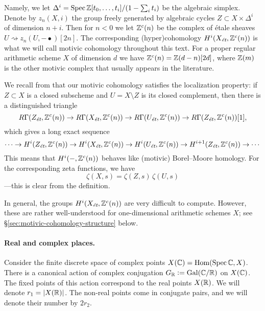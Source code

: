 \documentclass{article}
\numberwithin{equation}{section}
\begin{document}
Namely, we let $\Delta^i = \Spec \ZZ [t_0,\ldots,t_i] / (1 - \sum_i t_i)$ be the
algebraic simplex. Denote by $z_n (X, i)$ the group freely generated by
algebraic cycles $Z \subset X \times \Delta^i$ of dimension $n+i$. Then for
$n < 0$ we let $\ZZ^c (n)$ be the complex of étale sheaves
$U \rightsquigarrow z_n (U, -\bullet) [2n]$. The corresponding (hyper)cohomology
$H^i (X_\et, \ZZ^c (n))$ is what we will call motivic cohomology throughout this
text. For a proper regular arithmetic scheme $X$ of dimension $d$ we have
$\ZZ^c (n) = \ZZ (d-n) [2d]$, where $\ZZ (m)$ is the other motivic complex that
usually appears in the literature.

We recall from \cite[Corollary~7.2]{Geisser-2010} that our motivic cohomology
satisfies the localization property: if $Z \subset X$ is a closed subscheme and
$U = X\setminus Z$ is its closed complement, then there is a distinguished
triangle
\[ R\Gamma (Z_\et, \ZZ^c (n)) \to
  R\Gamma (X_\et, \ZZ^c (n)) \to
  R\Gamma (U_\et, \ZZ^c (n)) \to 
  R\Gamma (Z_\et, \ZZ^c (n)) [1], \]
which gives a long exact sequence
\begin{equation}
  \label{eqn:localization-les}
  \cdots \to H^i (Z_\et, \ZZ^c (n)) \to
  H^i (X_\et, \ZZ^c (n)) \to
  H^i (U_\et, \ZZ^c (n)) \to 
  H^{i+1} (Z_\et, \ZZ^c (n)) \to \cdots
\end{equation}
This means that $H^i (-, \ZZ^c (n))$ behaves like (motivic) Borel--Moore
homology. For the corresponding zeta functions, we have
$$\zeta (X,s) = \zeta (Z,s)\,\zeta (U,s)$$
---this is clear from the definition.

In general, the groups $H^i (X_\et, \ZZ^c (n))$ are very difficult to
compute. However, these are rather well-understood for one-dimensional
arithmetic schemes $X$; see \S\ref{sec:motivic-cohomology-structure} below.

\paragraph{Real and complex places.}
Consider the finite discrete space of complex points
$X(\CC) = \Hom (\Spec \CC, X)$. There is a canonical action of complex
conjugation $G_\RR \dfn \Gal (\CC/\RR)$ on $X(\CC)$. The fixed points of this
action correspond to the real points $X (\RR)$. We will denote
$r_1 = |X (\RR)|$. The non-real points come in conjugate pairs, and we will
denote their number by $2 r_2$.
\end{document}
